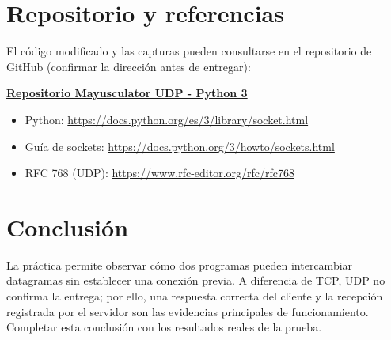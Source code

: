 \documentclass[11pt,a4paper]{article}
\newcommand{\Repositorio}{https://github.com/KarmaVS/Mayusculator-UDP-Python3}
\begin{document}
\section{Repositorio y referencias}
El código modificado y las capturas pueden consultarse en el repositorio de GitHub (confirmar la dirección antes de entregar):
\begin{center}\href{\Repositorio}{\textbf{Repositorio Mayusculator UDP - Python 3}}\end{center}
\begin{itemize}
\item Python: \url{https://docs.python.org/es/3/library/socket.html}
\item Guía de sockets: \url{https://docs.python.org/3/howto/sockets.html}
\item RFC 768 (UDP): \url{https://www.rfc-editor.org/rfc/rfc768}
\end{itemize}
\section{Conclusión}
La práctica permite observar cómo dos programas pueden intercambiar datagramas sin establecer una conexión previa. A diferencia de TCP, UDP no confirma la entrega; por ello, una respuesta correcta del cliente y la recepción registrada por el servidor son las evidencias principales de funcionamiento. Completar esta conclusión con los resultados reales de la prueba.
\end{document}
